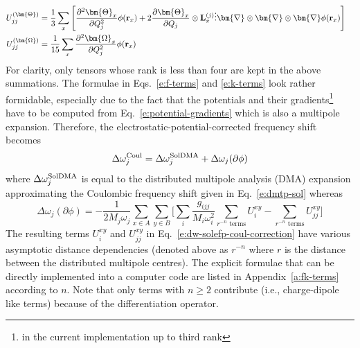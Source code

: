 \documentclass[a4paper,titlepage,twoside,fleqn,12pt]{book}
\newcommand{\BM}[1]{\bm{#1}}
\newcommand{\fderiv}[2]{\ensuremath{
    \frac{\partial #1}{\partial #2}}}
\newcommand{\sderiv}[2]{\ensuremath{
    \frac{\partial^2 #1}{\partial #2^2}
    }}
\begin{document}
\begin{refsection}
\begin{subequations}
\begin{align}
    \label{e:k-terms-2} \\
%
 U_{jj}^{(\BM\Theta)}  &= \frac{1}{3} \sum_x  
    \left[ \sderiv{{\BM \Theta}_x}{Q_j} \phi({\bf r}_x) 
    + 2 \fderiv{{\BM \Theta}_x}{Q_j} \otimes {\bf L}_x^{(j)} \vdots 
              {\BM \nabla}\otimes{\BM \nabla}\otimes{\BM \nabla} \phi({\bf r}_x)  \right]      
    \label{e:k-terms-3} \\
%
 U_{jj}^{(\BM\Omega)}  &= \frac{1}{15} \sum_x \sderiv{{\BM \Omega}_x}{Q_j} \phi({\bf r}_x)       \label{e:k-terms-4}
\end{align}
\end{subequations}
%
For clarity, only tensors whose rank is less than four are kept in the above summations.
The formulae in Eqs.~\eqref{e:f-terms} and \eqref{e:k-terms} look rather formidable,
especially due to the fact that the potentials and their 
gradients\footnote{in the current implementation up to third rank}
have to be computed from Eq.~\eqref{e:potential-gradients}
which is also a multipole expansion. Therefore,
the electrostatic\hyp{}potential\hyp{}corrected frequency shift
becomes
%
\begin{equation} \label{e:dw-solefp-coul}
\Delta \omega_j^{\rm Coul} = \Delta \omega_j^{\rm SolDMA} + \Delta\omega_j({\partial\phi}) 
\end{equation}
%
where $\Delta \omega_j^{\rm SolDMA}$ is equal to the distributed multipole analysis (DMA)
expansion approximating the Coulombic frequency shift given in Eq.~\eqref{e:dmtp-sol} whereas
%
\begin{equation} \label{e:dw-solefp-coul-correction}
\Delta\omega_j({\partial\phi})  = -\frac{1}{2M_j\omega_j}
\sum_{x \in A}\sum_{y \in B}
\Big[
\sum_i  \frac{g_{ijj}}{M_i\omega_i^2} \sum_{r^{-n} \textrm{ terms} } U_i^{xy} - \sum_{r^{-n} \textrm{ terms} } U_{jj}^{xy}
\Big]
\end{equation}
%
The resulting terms $U_i^{xy}$ and $U_{jj}^{xy}$ in Eq.~\eqref{e:dw-solefp-coul-correction}
have various asymptotic distance dependencies (denoted above as $r^{-n}$
where $r$ is the distance between the distributed multipole centres).
The explicit formulae
that can be directly implemented into a computer code
are listed in Appendix~\ref{a:fk-terms} according to $n$. 
Note that only terms with $n\ge 2$ contribute (i.e., charge-dipole
like terms) because of the differentiation operator.


\end{refsection}
\end{document}
